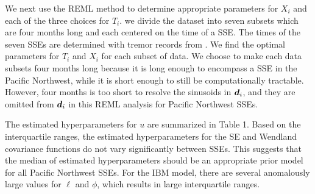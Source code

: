 \documentclass[extra,mreferee]{gji}
\begin{document}


We next use the REML method to determine appropriate parameters for
$X_i$ and each of the three choices for $T_i$. we divide the dataset
into seven subsets which are four months long and each centered on the
time of a SSE. The times of the seven SSEs are determined with tremor
records from \cite{Wech2010}. We find the optimal parameters for $T_i$
and $X_i$ for each subset of data. We choose to make each data subsets
four months long because it is long enough to encompass a SSE in the
Pacific Northwest, while it is short enough to still be
computationally tractable. However, four months is too short to
resolve the sinusoids in $\data_i$, and they are omitted from
$\data_i$ in this REML analysis for Pacific Northwest SSEs. 


The estimated hyperparameters for $u$ are summarized in Table 1. Based
on the interquartile ranges, the estimated hyperparameters for the SE
and Wendland covariance functions do not vary significantly between
SSEs. This suggests that the median of estimated hyperparameters
should be an appropriate prior model for all Pacific Northwest SSEs.
For the IBM model, there are several anomalously large values for
$\ell$ and $\phi$, which results in large interquartile ranges.
\end{document}
